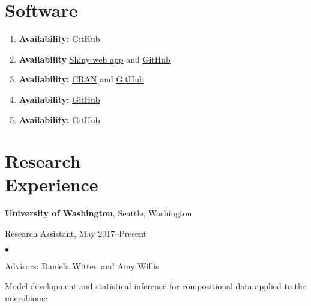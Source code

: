 \documentclass[margin,centered]{res}
\newenvironment{list1}{
  \begin{list}{\ding{113}}{%
      \setlength{\itemsep}{0in}
      \setlength{\parsep}{0in} \setlength{\parskip}{0in}
      \setlength{\topsep}{0in} \setlength{\partopsep}{0in}
      \setlength{\leftmargin}{0.17in}}}{\end{list}}
\newenvironment{list2}{
  \begin{list}{$\bullet$}{%
      \setlength{\itemsep}{0in}
      \setlength{\parsep}{0in} \setlength{\parskip}{0in}
      \setlength{\topsep}{0in} \setlength{\partopsep}{0in}
      \setlength{\leftmargin}{0.2in}}}{\end{list}}
\begin{document}
\begin{resume}
\section{\sc Software} 
\begin{enumerate}[leftmargin=*]
\item {}

\textbf{Availability:}
\href{https://github.com/bryandmartin/corncob}{GitHub}

\item {}

\textbf{Availability}
\href{https://serrat839.shinyapps.io/mRkov_shiny/}{Shiny web app} and \href{https://github.com/serrate839/mRkov}{GitHub}

    \item {}
    
    \textbf{Availability:} \href{https://CRAN.R-project.org/package=SUMMER}{CRAN} and \href{https://github.com/bryandmartin/SUMMER}{GitHub}
    \item {}
    
    \textbf{Availability:} \href{https://github.com/adw96/DivNet}{GitHub}
    
    \item {}
    
    \textbf{Availability:}
    \href{https://github.com/adw96/breakaway}{GitHub}
\end{enumerate}



\section{\sc Research\\ Experience}
{\bf University of Washington},  Seattle, Washington
\begin{list1}
\item[] 
Research Assistant, May 2017--Present
\begin{list2}
\vspace*{.05in}
\item Advisors: Daniela Witten and Amy Willis
\item Model development and statistical inference for compositional data applied to the microbiome
\end{list2} 
\end{list1}


\end{resume}
\end{document}
